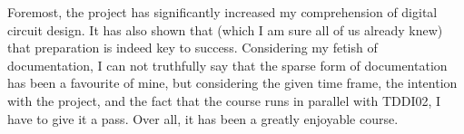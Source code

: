 Foremost, the project has significantly increased my comprehension of digital circuit design. It has also shown that (which I am sure all of us already knew) that preparation is indeed key to success. Considering my fetish of documentation, I can not truthfully say that the sparse form of documentation has been a favourite of mine, but considering the given time frame, the intention with the project, and the fact that the course runs in parallel with TDDI02, I have to give it a pass. Over all, it has been a greatly enjoyable course.
